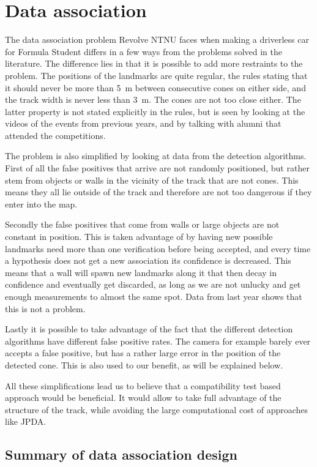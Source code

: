\section{Data association}

The data association problem Revolve NTNU faces when making a driverless car for Formula Student differs in a few ways from the problems solved in the literature. The difference lies in that it is possible to add more restraints to the problem. The positions of the landmarks are quite regular, the rules stating that it should never be more than \SI{5}{\meter} between consecutive cones on either side, and the track width is never less than \SI{3}{\meter}. The cones are not too close either. The latter property is not stated explicitly in the rules, but is seen by looking at the videos of the events from previous years, and by talking with alumni that attended the competitions. 

The problem is also simplified by looking at data from the detection algorithms. First of all the false positives that arrive are not randomly positioned, but rather stem from objects or walls in the vicinity of the track that are not cones. This means they all lie outside of the track and therefore are not too dangerous if they enter into the map. 

Secondly the false positives that come from walls or large objects are not constant in position. This is taken advantage of by having new possible landmarks need more than one verification before being accepted, and every time a hypothesis does not get a new association its confidence is decreased. This means that a wall will spawn new landmarks along it that then decay in confidence and eventually get discarded, as long as we are not unlucky and get enough measurements to almost the same spot. Data from last year shows that this is not a problem. 

Lastly it is possible to take advantage of the fact that the different detection algorithms have different false positive rates. The camera for example barely ever accepts a false positive, but has a rather large error in the position of the detected cone. This is also used to our benefit, as will be explained below. 

All these simplifications lead us to believe that a compatibility test based approach would be beneficial. It would allow to take full advantage of the structure of the track, while avoiding the large computational cost of approaches like \gls{JPDA}.

\subsection{Summary of data association design}

